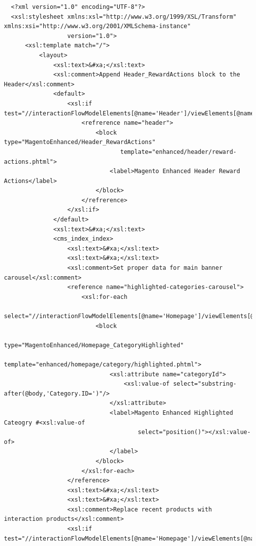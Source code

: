\vspace{0.5cm}
\lstset{language=XML}
\begin{lstlisting} 
  <?xml version="1.0" encoding="UTF-8"?>
  <xsl:stylesheet xmlns:xsl="http://www.w3.org/1999/XSL/Transform" xmlns:xsi="http://www.w3.org/2001/XMLSchema-instance"
                  version="1.0">
      <xsl:template match="/">
          <layout>
              <xsl:text>&#xa;</xsl:text>
              <xsl:comment>Append Header_RewardActions block to the Header</xsl:comment>
              <default>
                  <xsl:if test="//interactionFlowModelElements[@name='Header']/viewElements[@name='RecentRewardActions']">
                      <refrerence name="header">
                          <block type="MagentoEnhanced/Header_RewardActions"
                                 template="enhanced/header/reward-actions.phtml">
                              <label>Magento Enhanced Header Reward Actions</label>
                          </block>
                      </refrerence>
                  </xsl:if>
              </default>
              <xsl:text>&#xa;</xsl:text>
              <cms_index_index>
                  <xsl:text>&#xa;</xsl:text>
                  <xsl:text>&#xa;</xsl:text>
                  <xsl:comment>Set proper data for main banner carousel</xsl:comment>
                  <reference name="highlighted-categories-carousel">
                      <xsl:for-each
                              select="//interactionFlowModelElements[@name='Homepage']/viewElements[@name='HighlightedCategoriesCarousel']//parameters/constraints">
                          <block
                                  type="MagentoEnhanced/Homepage_CategoryHighlighted"
                                  template="enhanced/homepage/category/highlighted.phtml">
                              <xsl:attribute name="categoryId">
                                  <xsl:value-of select="substring-after(@body,'Category.ID=')"/>
                              </xsl:attribute>
                              <label>Magento Enhanced Highlighted Cateogry #<xsl:value-of
                                      select="position()"></xsl:value-of>
                              </label>
                          </block>
                      </xsl:for-each>
                  </reference>
                  <xsl:text>&#xa;</xsl:text>
                  <xsl:text>&#xa;</xsl:text>
                  <xsl:comment>Replace recent products with interaction products</xsl:comment>
                  <xsl:if test="//interactionFlowModelElements[@name='Homepage']/viewElements[@name='RecentlyInteractedProducts']">

\end{lstlisting}
